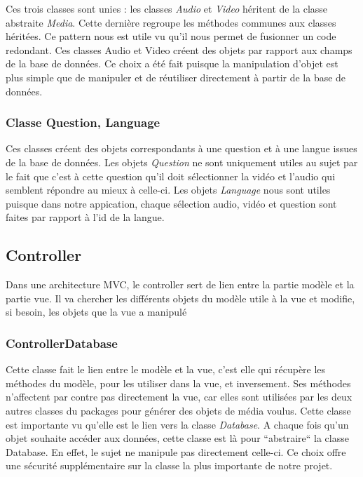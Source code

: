 Ces trois classes sont unies : les classes \textit{Audio} et \textit{Video} héritent de la classe abstraite \textit{Media}. Cette dernière regroupe les méthodes communes aux classes héritées. Ce pattern nous est utile vu qu'il nous permet de fusionner un code redondant. Ces classes Audio et Video créent des objets par rapport aux champs de la base de données. Ce choix a été fait puisque la manipulation d'objet est plus simple que de manipuler et de réutiliser directement à partir de la base de données.

\subsubsection{Classe Question, Language}

Ces classes créent des objets correspondants à une question et à une langue issues de la base de données.
Les objets \textit{Question} ne sont uniquement utiles au sujet par le fait que c'est à cette question qu'il doit sélectionner la vidéo et l'audio qui semblent répondre au mieux à celle-ci.
Les objets \textit{Language} nous sont utiles puisque dans notre appication, chaque sélection audio, vidéo et question sont faites par rapport à l'id de la langue.

\subsection{Controller}

Dans une architecture MVC, le controller sert de lien entre la partie modèle et la partie vue. Il va chercher les différents objets du modèle utile à la vue et modifie, si besoin, les objets que la vue a manipulé

\subsubsection{ControllerDatabase}

Cette classe fait le lien entre le modèle et la vue, c'est elle qui récupère les méthodes du modèle, pour les utiliser dans la vue, et inversement. Ses méthodes n'affectent par contre pas directement la vue, car elles sont utilisées par les deux autres classes du packages pour générer des objets de média voulus.
Cette classe est importante vu qu'elle est le lien vers la classe \textit{Database}. A chaque fois qu'un objet souhaite accéder aux données, cette classe est là pour ``abstraire`` la classe Database. En effet, le sujet ne manipule pas directement celle-ci. Ce choix offre une sécurité supplémentaire sur la classe la plus importante de notre projet.

